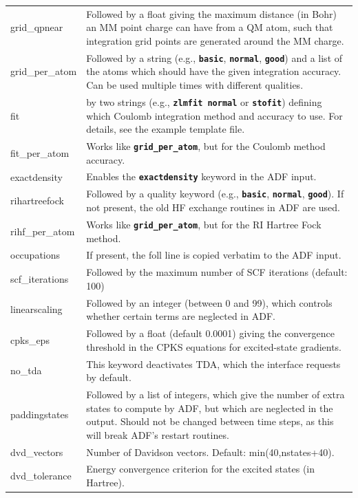 \documentclass[a4paper,10pt,DIV=15,openany,twoside=false]{scrbook}
\newcommand{\ttt}[1]{\textbf{\texttt{#1}}}
\begin{document}
\begin{table}
\begin{tabular}{>{\ttfamily}lp{12cm}}
\\
grid\_qpnear            &Followed by a float giving the maximum distance (in Bohr) an MM point charge can have from a QM atom, such that integration grid points are generated around the MM charge.
\\
grid\_per\_atom         &Followed by a string (e.g., \ttt{basic}, \ttt{normal}, \ttt{good}) and a list of the atoms which should have the given integration accuracy. Can be used multiple times with different qualities.
\\
fit                     &by two strings (e.g., \ttt{zlmfit normal} or \ttt{stofit}) defining which Coulomb integration method and accuracy to use. For details, see the example template file.
\\
fit\_per\_atom          &Works like \ttt{grid\_per\_atom}, but for the Coulomb method accuracy.
\\
exactdensity            &Enables the \ttt{exactdensity} keyword in the ADF input.
\\
rihartreefock           &Followed by a quality keyword (e.g., \ttt{basic}, \ttt{normal}, \ttt{good}). If not present, the old HF exchange routines in ADF are used.
\\
rihf\_per\_atom         &Works like \ttt{grid\_per\_atom}, but for the RI Hartree Fock method.
\\
occupations             &If present, the foll line is copied verbatim to the ADF input.
\\
scf\_iterations         &Followed by the maximum number of SCF iterations (default: 100)
\\
linearscaling           &Followed by an integer (between 0 and 99), which controls whether certain terms are neglected in ADF.
\\
cpks\_eps               &Followed by a float (default 0.0001) giving the convergence threshold in the CPKS equations for excited-state gradients.
\\
no\_tda                 &This keyword deactivates TDA, which the interface requests by default.
\\
paddingstates           &Followed by a list of integers, which give the number of extra states to compute by ADF, but which are neglected in the output. Should not be changed between time steps, as this will break ADF's restart routines.
\\
dvd\_vectors            &Number of Davidson vectors. Default: min(40,nstates+40).
\\
dvd\_tolerance          &Energy convergence criterion for the excited states (in Hartree).

\end{tabular}
\end{table}
\end{document}
